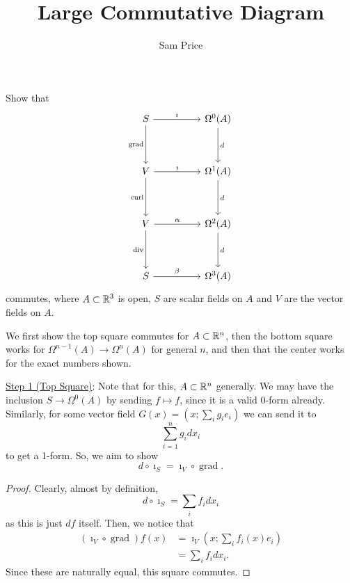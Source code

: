 \documentclass{article}
\author{Sam Price}
\title{Large Commutative Diagram}
\begin{document}
\maketitle

Show that
\[\begin{tikzcd}
  S && {\Omega^0(A)} \\
  \\
  V && {\Omega^1(A)} \\
  \\
  V && {\Omega^2(A)} \\
  \\
  S && {\Omega^3(A)}
  \arrow["\imath", from=1-1, to=1-3]
  \arrow["\operatorname{grad}"', from=1-1, to=3-1]
  \arrow["d", from=1-3, to=3-3]
  \arrow["\imath", from=3-1, to=3-3]
  \arrow["\operatorname{curl}"', from=3-1, to=5-1]
  \arrow["d", from=3-3, to=5-3]
  \arrow["\alpha", from=5-1, to=5-3]
  \arrow["\operatorname{div}"', from=5-1, to=7-1]
  \arrow["d", from=5-3, to=7-3]
  \arrow["\beta", from=7-1, to=7-3]
\end{tikzcd}\]
commutes, where $A \subset \RR[3]$ is open, $S$ are scalar fields on $A$ and $V$ are the vector fields on $A$.

We first show the top square commutes for $A \subset \RR[n]$, then the bottom square works for $\Omega^{n - 1}(A) \to \Omega^{n}(A)$ for general $n$, and
then that the center works for the exact numbers shown.

\underline{Step 1 (Top Square)}:
Note that for this, $A \subset \RR[n]$ generally.
We may have the inclusion $S \to \Omega^{0}(A)$ by sending $f \mapsto f$, since it is a valid 0-form already.
Similarly, for some vector field $G(x) = (x; \sum_{i}g_{i}e_{i})$ we can send it to
\[ \sum_{i = 1}^{n}g_{i}dx_{i} \]
to get a 1-form. So, we aim to show
\[ d \circ \imath_{S} = \imath_{V} \circ \operatorname{grad}. \]
\begin{proof}
  Clearly, almost by definition,
  \[ d \circ \imath_{S} = \sum_{i}f_{i}dx_{i} \]
  as this is just $df$ itself.
  Then, we notice that
  \begin{align*}
    (\imath_{V} \circ \operatorname{grad})f(x) &= \imath_{V}(x; \sum_{i}f_{i}(x)e_{i})\\
    &= \sum_{i}f_{i}dx_{i}.
  \end{align*}
  Since these are naturally equal, this square commutes.
\end{proof}
\end{document}
